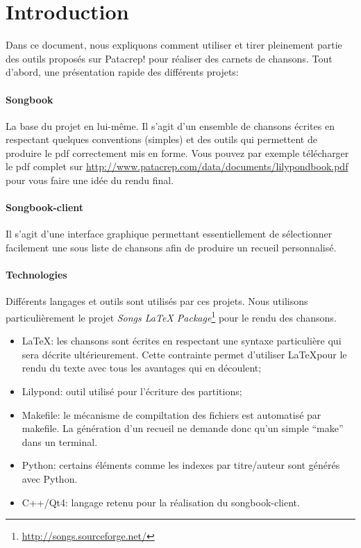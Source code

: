 \documentclass[versionenligne]{patacrep}
\begin{document}

\thispagestyle{empty}
\tableofcontents \newpage

\section*{Introduction}

Dans ce document, nous expliquons comment utiliser et tirer pleinement
partie des outils proposés sur Patacrep! pour réaliser des carnets de
chansons. Tout d'abord, une présentation rapide des différents projets:

\paragraph{Songbook}
La base du projet en lui-même. Il s'agit d'un ensemble de chansons
écrites en respectant quelques conventions (simples) et des outils qui
permettent de produire le pdf correctement mis en forme. Vous pouvez
par exemple télécharger le pdf complet sur
\url{http://www.patacrep.com/data/documents/lilypondbook.pdf} pour
vous faire une idée du rendu final.

\paragraph{Songbook-client} 
Il s'agit d'une interface graphique permettant essentiellement de
sélectionner facilement une sous liste de chansons afin de produire un
recueil personnalisé.

\paragraph{Technologies} 
Différents langages et outils sont utilisés par ces projets.  Nous
utilisons particulièrement le projet \emph{Songs LaTeX
  Package}\footnote{\url{http://songs.sourceforge.net/}} pour le
  rendu des chansons.

\begin{itemize}
\item \LaTeX: les chansons sont écrites en respectant une syntaxe
  particulière qui sera décrite ultérieurement. Cette contrainte
  permet d'utiliser \LaTeX pour le rendu du texte avec tous les
  avantages qui en découlent;
\item Lilypond: outil utilisé pour l'écriture des partitions;
\item Makefile: le mécanisme de compiltation des fichiers est
  automatisé par makefile.  La génération d'un recueil ne demande donc
  qu'un simple ``make'' dans un terminal.
\item Python: certains éléments comme les indexes par titre/auteur
  sont générés avec Python.
\item C++/Qt4: langage retenu pour la réalisation du songbook-client.
\end{itemize}
\end{document}
